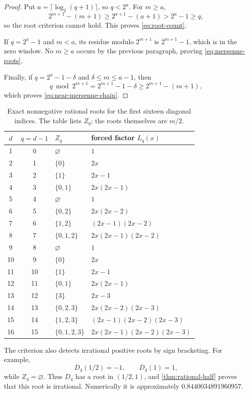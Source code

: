 \documentclass[11pt]{article}
\theoremstyle{definition}
\theoremstyle{remark}
\newcommand{\Diag}{D}
\begin{document}
\begin{proof}
Put \(a=\lceil\log_2(q+1)\rceil\), so \(q<2^a\).  For
\(m\geq a\),
\[
 2^{m+1}-(m+1)\geq2^{a+1}-(a+1)>2^a-1\geq q,
\]
so the root criterion cannot hold.  This proves \cref{eq:root-count}.

If \(q=2^a-1\) and \(m<a\), its residue modulo \(2^{m+1}\) is
\(2^{m+1}-1\), which is in the zero window.  No \(m\geq a\) occurs by the
previous paragraph, proving \cref{eq:mersenne-roots}.

Finally, if \(q=2^a-1-\delta\) and
\(\delta\leq m\leq a-1\), then
\[
 q\bmod2^{m+1}=2^{m+1}-1-\delta
 \geq2^{m+1}-(m+1),
\]
which proves \cref{eq:near-mersenne-chain}.
\end{proof}

\begin{table}[htbp]
\centering
\caption{Exact nonnegative rational roots for the first sixteen diagonal
indices.  The table lists \(Z_q\); the roots themselves are \(m/2\).}
\label{tab:root-sets}
\small
\begin{tabular}{c@{\qquad}c@{\qquad}l@{\qquad}l}
\toprule
\(d\)&\(q=d-1\)&\(Z_q\)&forced factor \(L_q(x)\)\\
\midrule
1&0&\(\varnothing\)&\(1\)\\
2&1&\(\{0\}\)&\(2x\)\\
3&2&\(\{1\}\)&\(2x-1\)\\
4&3&\(\{0,1\}\)&\(2x(2x-1)\)\\
5&4&\(\varnothing\)&\(1\)\\
6&5&\(\{0,2\}\)&\(2x(2x-2)\)\\
7&6&\(\{1,2\}\)&\((2x-1)(2x-2)\)\\
8&7&\(\{0,1,2\}\)&\(2x(2x-1)(2x-2)\)\\
9&8&\(\varnothing\)&\(1\)\\
10&9&\(\{0\}\)&\(2x\)\\
11&10&\(\{1\}\)&\(2x-1\)\\
12&11&\(\{0,1\}\)&\(2x(2x-1)\)\\
13&12&\(\{3\}\)&\(2x-3\)\\
14&13&\(\{0,2,3\}\)&\(2x(2x-2)(2x-3)\)\\
15&14&\(\{1,2,3\}\)&\((2x-1)(2x-2)(2x-3)\)\\
16&15&\(\{0,1,2,3\}\)&\(2x(2x-1)(2x-2)(2x-3)\)\\
\bottomrule
\end{tabular}
\end{table}

The criterion also detects irrational positive roots by sign bracketing.  For
example,
\[
 \Diag_4(1/2)=-1,
 \qquad
 \Diag_4(1)=1,
\]
while \(Z_4=\varnothing\).  Thus \(\Diag_4\) has a root in
\((1/2,1)\), and \cref{thm:rational-half} proves that this root is
irrational.  Numerically it is approximately
\(0.8440034891960957\).
\end{document}
